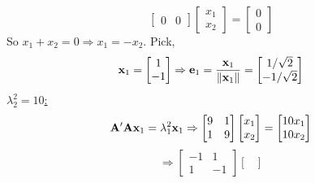 \begin{enumerate}[font=\bfseries]
\begin{enumerate}
\[\begin{bmatrix}
                    0 & 0
                \end{bmatrix}
                \begin{bmatrix}
                    x_1 \\
                    x_2
                \end{bmatrix}
                =
                \begin{bmatrix}
                    0 \\
                    0
                \end{bmatrix}
            \]
            So $x_1 + x_2 = 0 \Rightarrow x_1 = -x_2$. Pick,
            \[
                \bold{x}_1
                =
                \begin{bmatrix}
                    1 \\
                    -1
                \end{bmatrix}
                \Rightarrow
                \bold{e}_1
                =
                \frac{\bold{x}_1}{\left\|\bold{x}_1\right\|}
                =
                \begin{bmatrix}
                    1/\sqrt{2} \\
                    -1/\sqrt{2}
                \end{bmatrix}
            \]
            \underline{$\lambda_2^2 = 10$:}
            \[
                \bold{A}^\prime\bold{A}\bold{x}_1=\lambda_1^2\bold{x}_1
                \Rightarrow
                \begin{bmatrix}
                    9 & 1 \\
                    1 & 9
                \end{bmatrix}
                \begin{bmatrix}
                    x_1 \\
                    x_2
                \end{bmatrix}
                =
                \begin{bmatrix}
                    10x_1 \\
                    10x_2
                \end{bmatrix}
            \]
            \[
                \Rightarrow
                \begin{bmatrix}
                    -1 & 1 \\
                    1 & -1
                \end{bmatrix}
                \begin{bmatrix}

\end{bmatrix}\]
\end{enumerate}
\end{enumerate}
